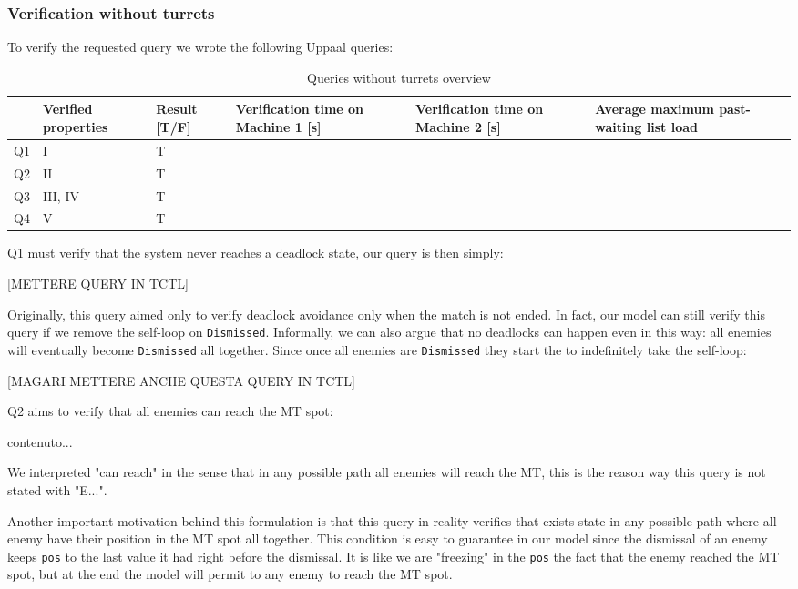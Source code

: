 \documentclass[
10pt, %
a4paper, %
oneside, %
headinclude,footinclude, %
BCOR5mm, %
]{scrartcl}
\begin{document}
			\subsubsection{Verification without turrets}
				To verify the requested query we wrote the following Uppaal queries:
				\begin{table}[h!]
					\centering
					\begin{tabularx}{\textwidth}{||c|>{\raggedright\arraybackslash}X|>{\raggedright\arraybackslash}X|>{\raggedright\arraybackslash}X|>{\raggedright\arraybackslash}X|>{\raggedright\arraybackslash}X||}
						\hline
						 & Verified properties & Result [T/F] & Verification time on Machine 1 [s] & Verification time on Machine 2 [s] & Average maximum past-waiting list load \\
						\hline
						Q1 & I & T& & & \\ \hline
						Q2 & II & T& & & \\ \hline
						Q3 & III, IV & T& & & \\ \hline
						Q4 & V & T& & & \\
						\hline
					\end{tabularx}
					\caption{Queries without turrets overview}
				\end{table}
				Q1 must verify that the system never reaches a deadlock state, our query is then simply:
				\begin{center}
					[METTERE QUERY IN TCTL]
				\end{center}
				Originally, this query aimed only to verify deadlock avoidance only when the match is not ended. In fact, our model can still verify this query if we remove the self-loop on \texttt{Dismissed}. Informally, we can also argue that no deadlocks can happen even in this way: all enemies will eventually become \texttt{Dismissed} all together. Since once all enemies are \texttt{Dismissed} they start the to indefinitely take the self-loop:
				\begin{center}
					[MAGARI METTERE ANCHE QUESTA QUERY IN TCTL]
				\end{center}
				
				Q2 aims to verify that all enemies can reach the MT spot:
				\begin{center}
					contenuto...
				\end{center}
				We interpreted "can reach" in the sense that in any possible path all enemies will reach the MT, this is the reason way this query is not stated with "E...".
				
				Another important motivation behind this formulation is that this query in reality verifies that exists state in any possible path where all enemy have their position in the MT spot all together. This condition is easy to guarantee in our model since the dismissal of an enemy keeps \texttt{pos} to the last value it had right before the dismissal. It is like we are "freezing" in the \texttt{pos} the fact that the enemy reached the MT spot, but at the end the model will permit to any enemy to reach the MT spot.
				
\end{document}
